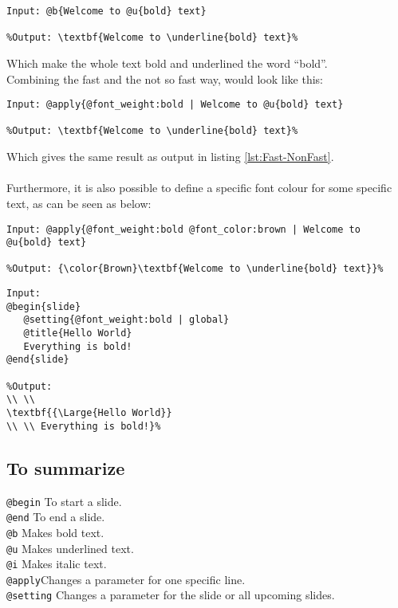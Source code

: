 \begin{lstlisting}[frame=single, label=lst:Fast-NonFast]
Input: @b{Welcome to @u{bold} text}

%Output: \textbf{Welcome to \underline{bold} text}%
\end{lstlisting}
Which make the whole text bold and underlined the word ``bold''.\\
Combining the fast and the not so fast way, would look like this:\\

\begin{lstlisting}[frame=single]
Input: @apply{@font_weight:bold | Welcome to @u{bold} text}

%Output: \textbf{Welcome to \underline{bold} text}%
\end{lstlisting}
Which gives the same result as output in listing \ref{lst:Fast-NonFast}.
\\ \\
Furthermore, it is also possible to define a specific font colour for some specific text, as can be seen as below:
\begin{lstlisting}[frame=single]
Input: @apply{@font_weight:bold @font_color:brown | Welcome to @u{bold} text}

%Output: {\color{Brown}\textbf{Welcome to \underline{bold} text}}%
\end{lstlisting}



\begin{lstlisting}[frame=single]
Input:
@begin{slide}
   @setting{@font_weight:bold | global}
   @title{Hello World}
   Everything is bold!
@end{slide}

%Output:
\\ \\
\textbf{{\Large{Hello World}}
\\ \\ Everything is bold!}%
\end{lstlisting}

\subsection*{To summarize}
\texttt{@begin} To start a slide. \\
\texttt{@end} To end a slide. \\
\texttt{@b} Makes bold text. \\
\texttt{@u} Makes underlined text. \\
\texttt{@i} Makes italic text. \\
\texttt{@apply}Changes a parameter for one specific line. \\
\texttt{@setting} Changes a parameter for the slide or all upcoming slides.\\

